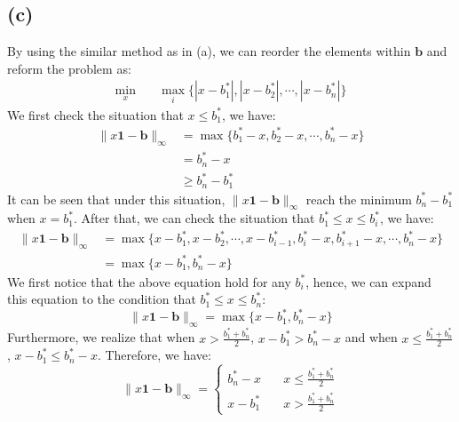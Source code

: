 \documentclass[10pt,a4paper]{article}
\begin{document}
\subsection*{(c)}
By using the similar method as in (a), we can reorder the elements within $\mathbf{b}$ and reform the problem as:
\begin{equation*}
	\begin{aligned}
		\displaystyle\min_{x} & \quad \displaystyle\max_{i} \{ |x - b^{*}_{1}|, |x - b^{*}_{2}|, \cdots, |x - b^{*}_{n}| \}
	\end{aligned}
\end{equation*}
We first check the situation that $x \leq b^{*}_{1}$, we have:
\begin{equation*}
	\begin{aligned}
		\| x \mathbf{1} - \mathbf{b} \|_{\infty} &= \displaystyle\max \{ b^{*}_{1} - x, b^{*}_{2} - x, \cdots, b^{*}_{n} - x \} \\
		&= b^{*}_{n} - x \\
		&\geq b^{*}_{n} - b^{*}_{1}
	\end{aligned}
\end{equation*}
It can be seen that under this situation, $\| x \mathbf{1} - \mathbf{b} \|_{\infty}$ reach the minimum $b^{*}_{n} - b^{*}_{1}$ when $x = b^{*}_{1}$.  After that, we can check the situation that $b^{*}_{1} \leq x \leq b^{*}_{i}$, we have:
\begin{equation*}
	\begin{aligned}
		\| x \mathbf{1} - \mathbf{b} \|_{\infty} &= \displaystyle\max\{ x - b^{*}_{1}, x - b^{*}_{2}, \cdots, x - b^{*}_{i - 1}, b^{*}_{i} - x, b^{*}_{i + 1} - x, \cdots, b^{*}_{n} - x \} \\
		&= \displaystyle\max \{ x - b^{*}_{1}, b^{*}_{n} - x \}
	\end{aligned}
\end{equation*}
We first notice that the above equation hold for any $b^{*}_{i}$, hence, we can expand this equation to the condition that $b^{*}_{1} \leq x \leq b^{*}_{n}$:
\begin{equation*}
	\| x \mathbf{1} - \mathbf{b} \|_{\infty} = \displaystyle\max \{ x - b^{*}_{1}, b^{*}_{n} - x \}
\end{equation*}
Furthermore, we realize that when $x > \frac{b^{*}_{1} + b^{*}_{n}}{2}$, $x - b^{*}_{1} > b^{*}_{n} - x$ and when $x \leq \frac{b^{*}_{1} + b^{*}_{n}}{2}$, $x - b^{*}_{1} \leq b^{*}_{n} - x$. Therefore, we have:
\begin{equation*}
	\| x \mathbf{1} - \mathbf{b} \|_{\infty} = 
	\begin{cases}
		b^{*}_{n} - x & \quad x \leq \frac{b^{*}_{1} + b^{*}_{n}}{2} \\
		x - b^{*}_{1} & \quad x > \frac{b^{*}_{1} + b^{*}_{n}}{2}
	\end{cases}
\end{equation*}
\end{document}
